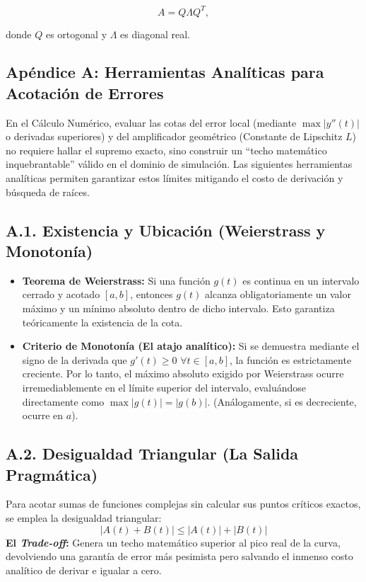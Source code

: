 \documentclass[12pt]{article}
\begin{document}
\[
    \boxed{
    A=Q\Lambda Q^T,
    }
\]

donde $Q$ es ortogonal y $\Lambda$ es diagonal real.

\subsection*{Apéndice A: Herramientas Analíticas para Acotación de Errores}

En el Cálculo Numérico, evaluar las cotas del error local (mediante $\max|y''(t)|$ o derivadas superiores) y del amplificador geométrico (Constante de Lipschitz $L$) no requiere hallar el supremo exacto, sino construir un ``techo matemático inquebrantable'' válido en el dominio de simulación. Las siguientes herramientas analíticas permiten garantizar estos límites mitigando el costo de derivación y búsqueda de raíces.

\subsection*{A.1. Existencia y Ubicación (Weierstrass y Monotonía)}
\begin{itemize}
    \item \textbf{Teorema de Weierstrass:} Si una función $g(t)$ es continua en un intervalo cerrado y acotado $[a, b]$, entonces $g(t)$ alcanza obligatoriamente un valor máximo y un mínimo absoluto dentro de dicho intervalo. Esto garantiza teóricamente la existencia de la cota.
    \item \textbf{Criterio de Monotonía (El atajo analítico):} Si se demuestra mediante el signo de la derivada que $g'(t) \ge 0$ $\forall t \in [a, b]$, la función es estrictamente creciente. Por lo tanto, el máximo absoluto exigido por Weierstrass ocurre irremediablemente en el límite superior del intervalo, evaluándose directamente como $\max|g(t)| = |g(b)|$. (Análogamente, si es decreciente, ocurre en $a$).
\end{itemize}

\subsection*{A.2. Desigualdad Triangular (La Salida Pragmática)}
Para acotar sumas de funciones complejas sin calcular sus puntos críticos exactos, se emplea la desigualdad triangular:
\begin{equation}
    |A(t) + B(t)| \le |A(t)| + |B(t)|
\end{equation}
\textbf{El \textit{Trade-off}:} Genera un techo matemático superior al pico real de la curva, devolviendo una garantía de error más pesimista pero salvando el inmenso costo analítico de derivar e igualar a cero.
\end{document}
